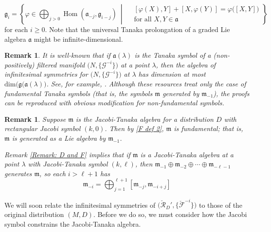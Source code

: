 \documentclass[11pt,letterpaper]{amsart}
\newtheorem{remark}[theorem]{Remark}
\numberwithin{equation}{section}
\begin{document}
\begin{equation}
\mathfrak{g}_i=\left\{\varphi\in\bigoplus_{j>0}\operatorname{Hom}(\mathfrak a_{-j},\mathfrak g_{i-j})\ \middle|\
\begin{aligned}
&[\varphi(X),Y]+[X,\varphi(Y)]=\varphi\big([X,Y]\big)\\
&\text{for all } X,Y\in\mathfrak a
\end{aligned}\right\}
\end{equation}
for each $i\geq 0$. Note that the universal Tanaka prolongation of a graded Lie algebra $\mathfrak{a}$ might be infinite-dimensional.
\begin{remark}
    \label{Remark: Tanaka symm}
    It is well-known that if $\mathfrak{a}(\lambda)$ is the Tanaka symbol of a (non-positively) filtered manifold $\big(N,\{\mathcal G^{-i}\}\big)$ at a point $\lambda$, then the algebra of infinitesimal symmetries for $\big(N,\{\mathcal G^{-i}\}\big)$ at $\lambda$ has dimension at most $\mathrm{dim}\big(\mathfrak g(\mathfrak a(\lambda)\big)$. See, for example, \cite{cap2017} \cite{Tanaka1970} \cite{Zelenko2009-qt}. Although these resources treat only the case of fundamental Tanaka symbols (that is, the symbols $\mathfrak m$ generated by $\mathfrak m_{-1}$), the proofs can be reproduced with obvious modification for non-fundamental symbols.
\end{remark}

\begin{remark}
    \label{Remark: generators of m}
    Suppose $\mathfrak{m}$ is the Jacobi-Tanaka algebra for a distribution $D$ with rectangular Jacobi symbol $(k,0)$. Then by \eqref{F def 2}, $\mathfrak{m}$ is \textit{fundamental}; that is, $\mathfrak{m}$ is generated as a Lie algebra by $\mathfrak m_{-1}$.

    Remark \ref{Remark: D and F} implies that if $\mathfrak m$ is a Jacobi-Tanaka algebra at a point $\lambda$ with Jacobi-Tanaka symbol $(k,\ell)$, then $\mathfrak m_{-1}\oplus\mathfrak m_{-2}\oplus\cdots \oplus \mathfrak m_{-\ell-1}$ generates $\mathfrak m$, so each $i>\ell+1$ has
    \begin{equation}
        \label{eqn: generators of mi}
        \mathfrak m_{-i} = \bigoplus_{j=1}^{\ell+1} [\mathfrak m_{-j}, \mathfrak m_{-i+j}]
    \end{equation}
\end{remark}

We will soon relate the infinitesimal symmetries of $\big(\check{\mathcal R}_D',\{\check{\mathcal F}^{-i}\}\big)$ to those of the original distribution $(M,D)$. Before we do so, we must consider how the Jacobi symbol constrains the Jacobi-Tanaka algebra.
\end{document}
